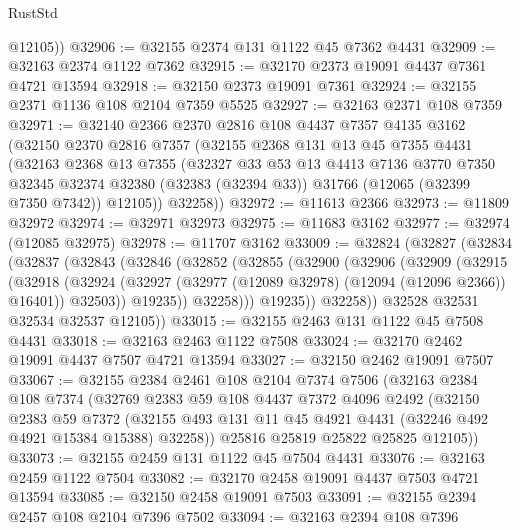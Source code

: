 \begin{lexlean}{RustStd}
\begin{coremodule}
        @12105))
@32906 := @32155 @2374 @131 @1122 @45 @7362 @4431
@32909 := @32163 @2374 @1122 @7362
@32915 := @32170 @2373 @19091 @4437 @7361 @4721 @13594
@32918 := @32150 @2373 @19091 @7361
@32924 := @32155 @2371 @1136 @108 @2104 @7359 @5525
@32927 := @32163 @2371 @108 @7359
@32971 := @32140
    @2366
    @2370
    @2816
    @108
    @4437
    @7357
    @4135
    @3162
    (@32150
      @2370
      @2816
      @7357
      (@32155
        @2368
        @131
        @13
        @45
        @7355
        @4431
        (@32163
          @2368
          @13
          @7355
          (@32327
            @33
            @53
            @13
            @4413
            @7136
            @3770
            @7350
            @32345
            @32374
            @32380
            (@32383 (@32394 @33))
            @31766
            (@12065 (@32399 @7350 @7342))
            @12105))
        @32258))
@32972 := @11613 @2366
@32973 := @11809 @32972
@32974 := @32971 @32973
@32975 := @11683 @3162
@32977 := @32974 (@12085 @32975)
@32978 := @11707 @3162
@33009 := @32824
    (@32827
      (@32834
        (@32837
          (@32843
            (@32846
              (@32852
                (@32855
                  (@32900
                    (@32906
                      (@32909
                        (@32915
                          (@32918
                            (@32924
                              (@32927 (@32977 (@12089 @32978) (@12094 (@12096 @2366)) @16401))
                              @32503))
                          @19235))
                      @32258)))
                @19235))
            @32258))
        @32528
        @32531
        @32534
        @32537
        @12105))
@33015 := @32155 @2463 @131 @1122 @45 @7508 @4431
@33018 := @32163 @2463 @1122 @7508
@33024 := @32170 @2462 @19091 @4437 @7507 @4721 @13594
@33027 := @32150 @2462 @19091 @7507
@33067 := @32155
    @2384
    @2461
    @108
    @2104
    @7374
    @7506
    (@32163
      @2384
      @108
      @7374
      (@32769
        @2383
        @59
        @108
        @4437
        @7372
        @4096
        @2492
        (@32150
          @2383
          @59
          @7372
          (@32155 @493 @131 @11 @45 @4921 @4431 (@32246 @492 @4921 @15384 @15388) @32258))
        @25816
        @25819
        @25822
        @25825
        @12105))
@33073 := @32155 @2459 @131 @1122 @45 @7504 @4431
@33076 := @32163 @2459 @1122 @7504
@33082 := @32170 @2458 @19091 @4437 @7503 @4721 @13594
@33085 := @32150 @2458 @19091 @7503
@33091 := @32155 @2394 @2457 @108 @2104 @7396 @7502
@33094 := @32163 @2394 @108 @7396

\end{coremodule}
\end{lexlean}
